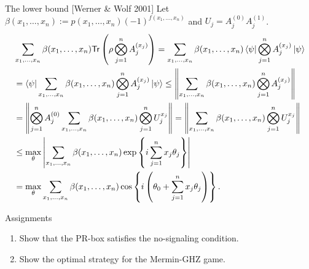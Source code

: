 \documentclass{beamer}
\newcommand{\Tr}{\mathsf{Tr}}
\begin{document}
\begin{frame}{The lower bound {\small [Werner \& Wolf 2001]}}
\small
Let $\beta(x_1,\dotsc,x_n):=p(x_1,\dotsc,x_n)(-1)^{f(x_1,\dotsc,x_n)}$ and $U_j = A_j^{(0)}A_j^{(1)}$.
\begin{align*}
&\sum_{x_1,\dotsc,x_n}\beta(x_1,\dotsc,x_n)\Tr\left(\rho\bigotimes_{j=1}^n A_j^{(x_j)}\right)
=\sum_{x_1,\dotsc,x_n}\beta(x_1,\dotsc,x_n)\bra{\psi}\bigotimes_{j=1}^n A_j^{(x_j)}\ket{\psi}\\
&=\bra{\psi}\sum_{x_1,\dotsc,x_n}\beta(x_1,\dotsc,x_n)\bigotimes_{j=1}^n A_j^{(x_j)}\ket{\psi}
\le\left\|\sum_{x_1,\dotsc,x_n}\beta(x_1,\dotsc,x_n)\bigotimes_{j=1}^n A_j^{(x_j)}\right\|\\
&=\left\|\bigotimes_{j=1}^nA_j^{(0)}\sum_{x_1,\dotsc,x_n}\beta(x_1,\dotsc,x_n)\bigotimes_{j=1}^n U_j^{x_j}\right\|
=\left\|\sum_{x_1,\dotsc,x_n}\beta(x_1,\dotsc,x_n)\bigotimes_{j=1}^n U_j^{x_j}\right\|\\
&\le\max_{\theta}\left|\sum_{x_1,\dotsc,x_n}\beta(x_1,\dotsc,x_n)\exp\left\{i\sum_{j=1}^n x_j\theta_j\right\}\right|\\
&=\max_{\theta}\sum_{x_1,\dotsc,x_n}\beta(x_1,\dotsc,x_n)\cos\left\{i\left(\theta_0 + \sum_{j=1}^n x_j\theta_j\right)\right\}.
\end{align*}
\end{frame}

\begin{frame}{Assignments}
\begin{enumerate}
\setlength{\itemsep}{2em}
\item Show that the PR-box satisfies the no-signaling condition.
\item Show the optimal strategy for the Mermin-GHZ game.
\end{enumerate}
\end{frame}
\end{document}
